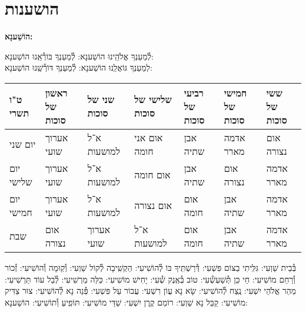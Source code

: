 \documentclass[twoside, openany, parskip=half, 11pt]{book}
\begin{document}


\chapter[הושענות]{ הושענות }
\label{hoshanos}


\begin{Large}
\textbf{
הוֹשַׁענָא:
}
\end{Large}


לְ֯מַעַנְךָ אֱלֹהֵֽינוּ הוֹשַׁענָא: לְ֯מַעַנְךָ בּוֹרְ֯אֵֽנוּ הוֹשַׁענָא:\\
לְמַעַנְךָ גּוֹאֲלֵֽנוּ הוֹשַׁענָא: לְ֯מַעַנְךָ דּוֹרְ֯שֵֽׁנוּ הוֹשַׁענָא:

\begin{tiny}
\begin{tabular}{>{\centering\arraybackslash}m{}||>{\centering\arraybackslash}m{}|>{\centering\arraybackslash}m{}|>{\centering\arraybackslash}m{}|>{\centering\arraybackslash}m{}|>{\centering\arraybackslash}m{}|>{\centering\arraybackslash}m{}}
ט"ו תשרי & ראשון של סוכות & שני של סוכות & שלישי של סוכות & רביעי של סוכות & חמישי של סוכות & ששי של סוכות \\
\hline \hline
יום שני & אערוך שועי & א־ל למושעות & אום אני חומה & אבן שתיה & אדמה מארר & אום נצורה\\ \hline
יום שלישי & אערוך שועי & א־ל למושעות & אום חומה & אבן שתיה & אום נצורה & אדמה מארר \\ \hline
יום חמישי & אערוך שועי & א־ל למושעות & אום נצורה & אום חומה & אבן שתיה & אדמה מארר\\ \hline
שבת & אום נצורה & אערוך שועי & א־ל למושעות & אום חומה & אבן שתיה & אדמה מארר
\end{tabular}

\end{tiny}


בְּ֯בֵית שַׁוְעִי: גִּלִּֽיתִי בַצּוֹם פִּשְׁעִי: דְּ֯רַשְׁתִּֽיךָ בּוֹ לְ֯הוֹשִׁיעִי: הַקְשִֽׁיבָה לְ֯קוֹל שַׁוְעִי: וְ֯קֽוּמָה וְ֯הוֹשִׁיעִי: זְ֯כוֹר וְ֯רַחֵם מוֹשִׁיעִי: חַי כֵּן תְּ֯שַׁעְשְׁ֯עִי: טוֹב בְּ֯אֶֽנֶק שְׁ֯עִי: יָחִישׁ מוֹשִׁיעִי: כַּלֵּה מַרְשִׁיעִי: לְ֯בַל עוֹד תַּרְשִׁיעִי: מַהֵר אֱלֹהֵי יִשְׁעִי: נֶֽצַח לְ֯הוֹשִׁיעִי: שָׂא נָא עֲוֹן רִשְׁעִי: עֲבוֹר עַל פִּשְׁעִי: פְּ֯נֵה נָא לְ֯הוֹשִׁיעִי: צוּר צַדִּיק מוֹשִׁיעִי: קַבֵּל נָא שַׁוְעִי: רוֹמֵם קֶֽרֶן יִשְׁעִי:
שַׁדַּי מוֹשִׁיעִי: תּוֹפִֽיעַ וְ֯תוֹשִׁיעִי: הוֹשַׁענָא:

\end{document}
